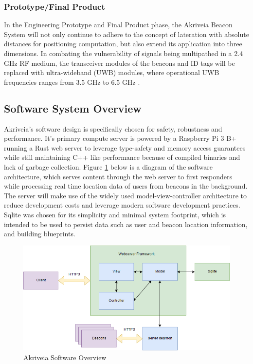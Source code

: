 \subsubsection{Prototype/Final Product}
In the Engineering Prototype and Final Product phase, the Akriveia Beacon System will not only continue to adhere to the concept of lateration with absolute distances for positioning computation, but also extend its application into three dimensions. In combating the vulnerability of signals being multipathed in a 2.4 GHz RF medium, the transceiver modules of the beacons and ID tags will be replaced with ultra-wideband (UWB) modules, where operational UWB frequencies ranges from 3.5 GHz to 6.5 GHz \cite{R42}.
\break



\subsection{Software System Overview}
\bigskip
Akriveia's software design is specifically chosen for safety, robustness and performance. It's primary compute server is powered by a Raspberry Pi 3 B+ running a Rust web server to leverage type-safety and memory access guarantees while still maintaining C++ like performance because of compiled binaries and lack of garbage collection. Figure \ref{software_diagram} below is a diagram of the software architecture, which serves content through the web server to first responders while processing real time location data of users from beacons in the background. The server will make use of the widely used model-view-controller architecture to reduce development costs and leverage modern software development practices. Sqlite was chosen for its simplicity and minimal system footprint, which is intended to be used to persist data such as user and beacon location information, and building blueprints.

\bigskip
\begin{figure}[h!]
    \centering
    \includegraphics[width=\linewidth]{./images/softwarediagram.png}
    \caption{Akriveia Software Overview}
    \label{software_diagram}
\end{figure}
\bigskip


%
